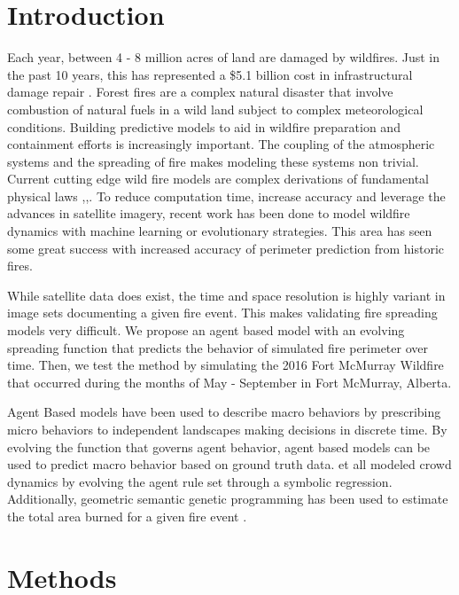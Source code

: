 \section{Introduction}

Each year, between 4 - 8 million acres of land are damaged by wildfires. Just in the past 10 years, this has represented a \$5.1 billion cost in 
infrastructural damage repair \cite{verisk}. 
Forest fires are a complex natural disaster that involve combustion of natural fuels in a wild land subject 
to complex meteorological conditions. Building predictive models to aid in wildfire preparation and containment efforts
is increasingly important. The coupling of the atmospheric systems and the spreading
of fire makes modeling these systems non trivial.  Current cutting edge wild fire models are complex derivations of fundamental 
physical laws \cite{FIRETEC},\cite{Sero-GuillaumeO},\cite{mandel2011coupled}. To reduce computation time, increase accuracy and leverage the advances in satellite
imagery, recent work has been done to model wildfire dynamics with machine learning or evolutionary strategies. This area has seen some great success with 
increased accuracy of perimeter prediction from historic fires. 


While satellite data does exist, the time and space resolution is highly variant in image sets documenting a given fire event. This makes validating fire spreading models
very difficult. We propose an agent based model with an evolving spreading function that predicts the behavior of simulated fire perimeter over time. Then, 
we test the method by simulating the 2016 Fort McMurray Wildfire that occurred during the months of May - September in Fort McMurray, Alberta. 

Agent Based models have been used to describe macro behaviors by prescribing micro behaviors to independent landscapes making decisions in discrete time.
By evolving the function that governs agent behavior, agent based models can be used to predict macro behavior based on ground truth data. \cite{zhong2014automatic}
et all modeled crowd dynamics by evolving the agent rule set through a symbolic regression. Additionally, geometric semantic genetic programming has been used to estimate
the total area burned for a given fire event \cite{castelli2015Mauro}.  



\section{Methods}
